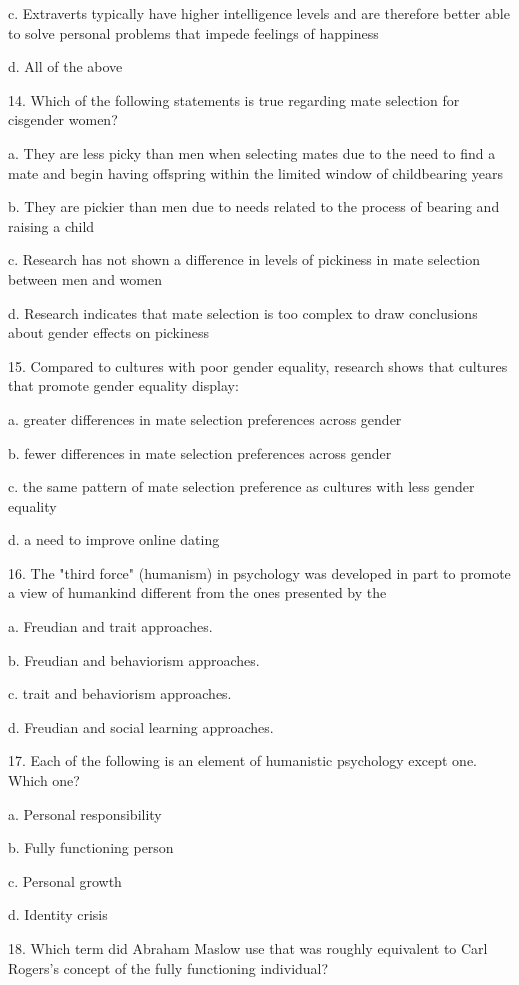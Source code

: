 \documentclass{article}
\begin{document}
c. Extraverts typically have higher intelligence levels and are therefore better able to solve personal problems that impede feelings of happiness

d. All of the above

14. Which of the following statements is true regarding mate selection for cisgender women?

a. They are less picky than men when selecting mates due to the need to find a mate and begin having offspring within the limited window of childbearing years

b. They are pickier than men due to needs related to the process of bearing and raising a child

c. Research has not shown a difference in levels of pickiness in mate selection between men and women

d. Research indicates that mate selection is too complex to draw conclusions about gender effects on pickiness

15. Compared to cultures with poor gender equality, research shows that cultures that promote gender equality display:

a. greater differences in mate selection preferences across gender

b. fewer differences in mate selection preferences across gender

c. the same pattern of mate selection preference as cultures with less gender equality

d. a need to improve online dating

16. The "third force" (humanism) in psychology was developed in part to promote a view of humankind different from the ones presented by the

a. Freudian and trait approaches.

b. Freudian and behaviorism approaches.

c. trait and behaviorism approaches.

d. Freudian and social learning approaches.

17. Each of the following is an element of humanistic psychology except one. Which one?

a. Personal responsibility

b. Fully functioning person

c. Personal growth

d. Identity crisis

18. Which term did Abraham Maslow use that was roughly equivalent to Carl Rogers's concept of the fully functioning individual?
\end{document}
